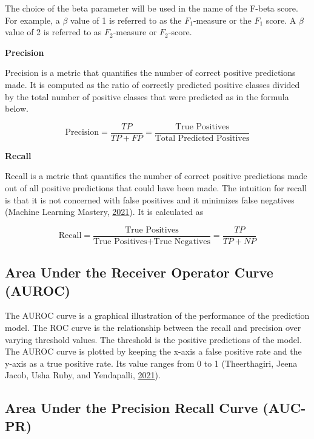 \documentclass[
  10pt,
]{article}
\begin{document}
The choice of the beta parameter will be used in the name of the F-beta score. For example, a \(\beta\) value of 1 is referred to as the \(F_1\)-measure or the \(F_1\) score. A \(\beta\) value of 2 is referred to as \(F_2\)-measure or \(F_2\)-score.

\textbf{Precision}

Precision is a metric that quantifies the number of correct positive predictions made. It is computed as the ratio of correctly predicted positive classes divided by the total number of positive classes that were predicted as in the formula below.

\[
\text{Precision} = \frac{TP}{TP + FP} = \frac{\text{True Positives}}{\text{Total Predicted Positives}}
\]

\textbf{Recall}

Recall is a metric that quantifies the number of correct positive predictions made out of all positive predictions that could have been made. The intuition for recall is that it is not concerned with false positives and it minimizes false negatives (Machine Learning Mastery, \protect\hyperlink{ref-MLM}{2021}). It is calculated as

\[
\text{Recall} = \frac{\text{True Positives}}{\text{True Positives} + \text{True Negatives}} = \frac{TP}{TP + NP}
\]

\hypertarget{area-under-the-receiver-operator-curve-auroc}{%
\subsection{Area Under the Receiver Operator Curve (AUROC)}\label{area-under-the-receiver-operator-curve-auroc}}

The AUROC curve is a graphical illustration of the performance of the prediction model. The
ROC curve is the relationship between the recall and precision over varying threshold values. The threshold is the positive predictions of the model. The AUROC curve is plotted by keeping the x-axis a false positive rate and the y-axis as a true positive rate. Its value ranges from 0 to 1 (Theerthagiri, Jeena Jacob, Usha Ruby, and Yendapalli, \protect\hyperlink{ref-theerthagiri2021prediction}{2021}).

\hypertarget{area-under-the-precision-recall-curve-auc-pr}{%
\subsection{Area Under the Precision Recall Curve (AUC-PR)}\label{area-under-the-precision-recall-curve-auc-pr}}
\end{document}
